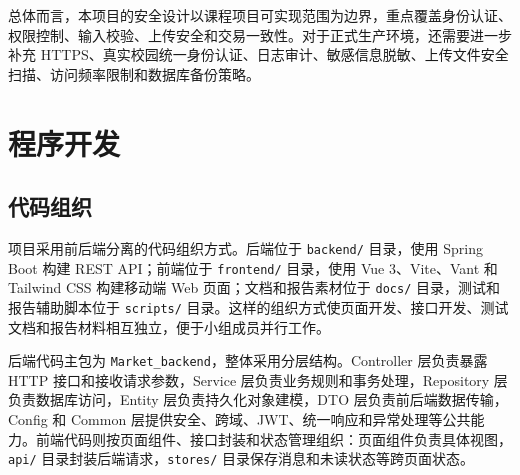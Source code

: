 ﻿\documentclass[UTF8,a4paper,12pt]{ctexart}
\begin{document}
总体而言，本项目的安全设计以课程项目可实现范围为边界，重点覆盖身份认证、权限控制、输入校验、上传安全和交易一致性。对于正式生产环境，还需要进一步补充 HTTPS、真实校园统一身份认证、日志审计、敏感信息脱敏、上传文件安全扫描、访问频率限制和数据库备份策略。

\section{程序开发}

\subsection{代码组织}
项目采用前后端分离的代码组织方式。后端位于 \texttt{backend/} 目录，使用 Spring Boot 构建 REST API；前端位于 \texttt{frontend/} 目录，使用 Vue 3、Vite、Vant 和 Tailwind CSS 构建移动端 Web 页面；文档和报告素材位于 \texttt{docs/} 目录，测试和报告辅助脚本位于 \texttt{scripts/} 目录。这样的组织方式使页面开发、接口开发、测试文档和报告材料相互独立，便于小组成员并行工作。

后端代码主包为 \texttt{Market\_backend}，整体采用分层结构。Controller 层负责暴露 HTTP 接口和接收请求参数，Service 层负责业务规则和事务处理，Repository 层负责数据库访问，Entity 层负责持久化对象建模，DTO 层负责前后端数据传输，Config 和 Common 层提供安全、跨域、JWT、统一响应和异常处理等公共能力。前端代码则按页面组件、接口封装和状态管理组织：页面组件负责具体视图，\texttt{api/} 目录封装后端请求，\texttt{stores/} 目录保存消息和未读状态等跨页面状态。
\end{document}
